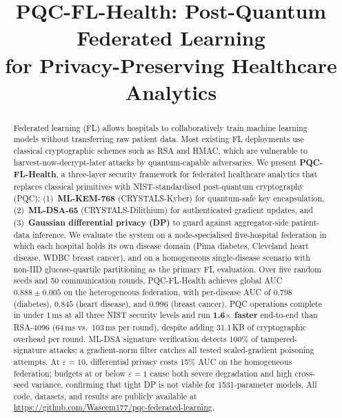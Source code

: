 \documentclass[conference]{IEEEtran}
\begin{document}
\title{PQC-FL-Health: Post-Quantum Federated Learning\\
for Privacy-Preserving Healthcare Analytics}

\author{
}

\maketitle

\begin{abstract}
Federated learning (FL) allows hospitals to collaboratively train
machine learning models without transferring raw patient data.
Most existing FL deployments use classical cryptographic schemes such
as RSA and HMAC, which are vulnerable to harvest-now-decrypt-later
attacks by quantum-capable adversaries.
We present \textbf{PQC-FL-Health}, a three-layer security framework
for federated healthcare analytics that replaces classical primitives
with NIST-standardised post-quantum cryptography (PQC):
(1)~\textbf{ML-KEM-768} (CRYSTALS-Kyber) for quantum-safe key
encapsulation, (2)~\textbf{ML-DSA-65} (CRYSTALS-Dilithium) for
authenticated gradient updates, and (3)~\textbf{Gaussian differential
privacy (DP)} to guard against aggregator-side patient-data inference.
We evaluate the system on a node-specialised five-hospital federation
in which each hospital holds its own disease domain
(Pima diabetes, Cleveland heart disease, WDBC breast cancer),
and on a homogeneous single-disease scenario with non-IID
glucose-quartile partitioning as the primary FL evaluation.
Over five random seeds and 50 communication rounds, PQC-FL-Health
achieves global AUC $0.888 \pm 0.005$ on the heterogeneous
federation, with per-disease AUC of $0.798$ (diabetes),
$0.845$ (heart disease), and $0.996$ (breast cancer).
PQC operations complete in under 1\,ms at all three NIST security
levels and run \textbf{1.6$\times$ faster} end-to-end than RSA-4096
(64\,ms vs.\ 103\,ms per round), despite adding 31.1\,KB of
cryptographic overhead per round.
ML-DSA signature verification detects 100\% of tampered-signature
attacks; a gradient-norm filter catches all tested scaled-gradient
poisoning attempts.
At $\varepsilon = 10$, differential privacy costs 15\% AUC on the
homogeneous federation; budgets at or below $\varepsilon = 1$ cause
both severe degradation and high cross-seed variance, confirming that
tight DP is not viable for 1531-parameter models.
All code, datasets, and results are publicly available at
\url{https://github.com/Waseem177/pqc-federated-learning}.
\end{abstract}
\end{document}
